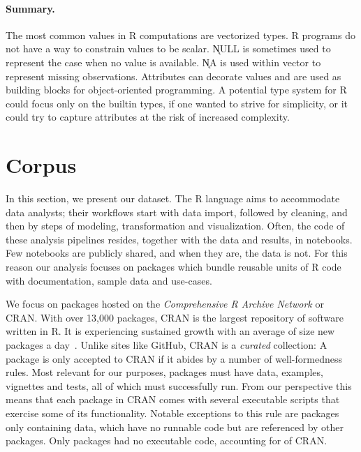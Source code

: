 \documentclass[acmsmall,10pt,review,anonymous]{acmart}\settopmatter{printfolios=true,printccs=false,printacmref=false}
\begin{document}
\paragraph{Summary.} The most common values in R computations are vectorized
types. R programs do not have a way to constrain values to be scalar.
\k{NULL} is sometimes used to represent the case when no value is
available. \k{NA} is used within vector to represent missing observations.
Attributes can decorate values and are used as building blocks for
object-oriented programming. A potential type system for R could focus only
on the builtin types, if one wanted to strive for simplicity, or it could
try to capture attributes at the risk of increased complexity.

\newpage
\section{Corpus}\label{sec:corpus}

In this section, we present our dataset. The R language aims to accommodate
data analysts; their workflows start with data import, followed by cleaning,
and then by steps of modeling, transformation and visualization. Often, the
code of these analysis pipelines resides, together with the data and
results, in notebooks. Few notebooks are publicly shared, and when they are,
the data is not. For this reason our analysis focuses on packages which
bundle reusable units of R code with documentation, sample data and
use-cases.

We focus on packages hosted on the \emph{Comprehensive R Archive Network} or
CRAN.  With over 13,000 packages, CRAN is the largest repository of software
written in R. It is experiencing sustained growth with an average of size
new packages a day~\cite{LIgges2017}.  Unlike sites like GitHub, CRAN is a
\emph{curated} collection: A package is only accepted to CRAN if it abides
by a number of well-formedness rules.  Most relevant for our purposes,
packages must have data, examples, vignettes and tests, all of which must
successfully run. From our perspective this means that each package in CRAN
comes with several executable scripts that exercise some of its
functionality.  Notable exceptions to this rule are packages only containing
data, which have no runnable code but are referenced by other packages.
Only \DATAPKGS packages had no executable code, accounting for \DATAPKGSPERC
of CRAN.
\end{document}
